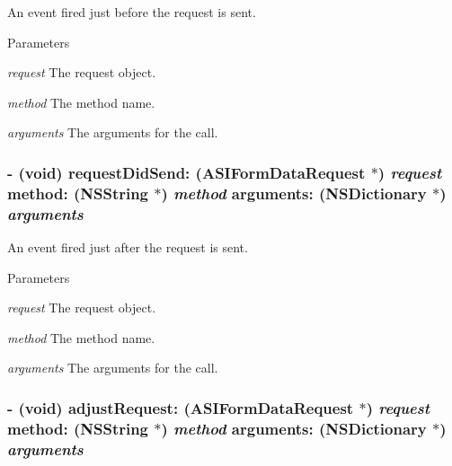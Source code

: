 An event fired just before the request is sent. 
\begin{DoxyParams}{Parameters}
\item[{\em request}]The request object. \item[{\em method}]The method name. \item[{\em arguments}]The arguments for the call. \end{DoxyParams}
\hypertarget{protocol_r_m_call_protocol-p_ae502b8d3070e9de7a6b125b16a8db5cf}{
\subsubsection[{requestDidSend:method:arguments:}]{\setlength{\rightskip}{0pt plus 5cm}-\/ (void) requestDidSend: ({\bf ASIFormDataRequest} $\ast$) {\em request}\/ method: ({\bf NSString} $\ast$) {\em method}\/ arguments: (NSDictionary $\ast$) {\em arguments}}}
\label{protocol_r_m_call_protocol-p_ae502b8d3070e9de7a6b125b16a8db5cf}


An event fired just after the request is sent. 
\begin{DoxyParams}{Parameters}
\item[{\em request}]The request object. \item[{\em method}]The method name. \item[{\em arguments}]The arguments for the call. \end{DoxyParams}
\hypertarget{protocol_r_m_call_protocol-p_ab3c27370fb06c6083131b5338dcabe2f}{
\subsubsection[{adjustRequest:method:arguments:}]{\setlength{\rightskip}{0pt plus 5cm}-\/ (void) adjustRequest: ({\bf ASIFormDataRequest} $\ast$) {\em request}\/ method: ({\bf NSString} $\ast$) {\em method}\/ arguments: (NSDictionary $\ast$) {\em arguments}}}
\label{protocol_r_m_call_protocol-p_ab3c27370fb06c6083131b5338dcabe2f}


